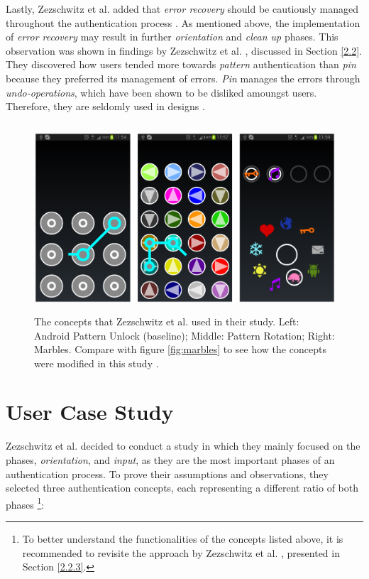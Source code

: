 Lastly, Zezschwitz et al. \cite{Zezschwitz} added that \textit{error recovery} should be cautiously managed throughout the authentication process \cite{Zezschwitz}. As mentioned above, the implementation of \textit{error recovery} may result in further \textit{orientation} and \textit{clean up} phases. This observation was shown in findings by Zezschwitz et al. \cite{PatternWild}, discussed in Section \ref{2.2}. They discovered how users tended more towards \textit{pattern} authentication than \textit{pin} because they preferred its management of errors. \textit{Pin} manages the errors through \textit{undo-operations}, which have been shown to be disliked amoungst users. Therefore, they are seldomly used in designs \cite{PatternWild, Zezschwitz}. 

\begin{figure}[t!]
\centering
\includegraphics[width=14cm, height=7cm]{Chapters/graphics/androidPatternMarble.PNG}
\caption{The concepts that Zezschwitz et al. \cite{Zezschwitz} used in their study. Left: Android Pattern Unlock (baseline); Middle: Pattern Rotation; Right: Marbles. Compare with figure \ref{fig:marbles} to see how the concepts were modified in this study \cite{Zezschwitz}.}
\label{fig:android}
\end{figure}

\section{User Case Study}

Zezschwitz et al. \cite{Zezschwitz} decided to conduct a study in which they mainly focused on the phases, \textit{orientation}, and \textit{input}, as they are the most important phases of an authentication process. To prove their assumptions and observations, they selected three authentication concepts, each representing a different ratio of both phases \cite{Zezschwitz}
\footnote{To better understand the functionalities of the concepts listed above, it is recommended to revisite the approach by Zezschwitz et al. \cite{Marbles}, presented in Section \ref{2.2.3}.}: 

